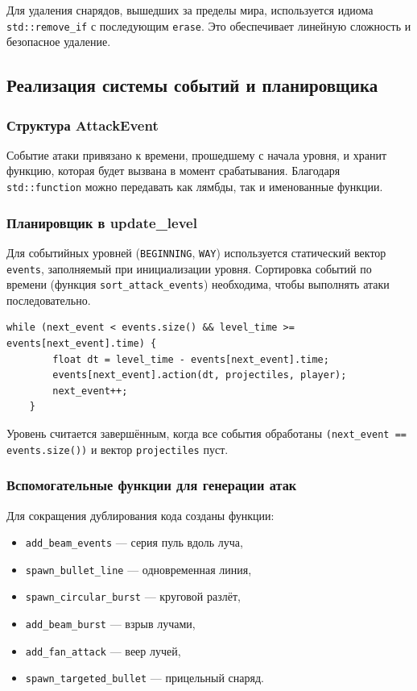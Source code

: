 \documentclass[../main.tex]{subfiles}
\begin{document}
Для удаления снарядов, вышедших за пределы мира, используется идиома \texttt{std::remove\_if} с последующим \texttt{erase}. Это обеспечивает линейную сложность и безопасное удаление.

\subsection{Реализация системы событий и планировщика}

\subsubsection{Структура AttackEvent}

Событие атаки привязано к времени, прошедшему с начала уровня, и хранит функцию, которая будет вызвана в момент срабатывания. Благодаря \texttt{std::function} можно передавать как лямбды, так и именованные функции.

\subsubsection{Планировщик в update\_level}

Для событийных уровней (\texttt{BEGINNING}, \texttt{WAY}) используется статический вектор \texttt{events}, заполняемый при инициализации уровня. Сортировка событий по времени (функция \texttt{sort\_attack\_events}) необходима, чтобы выполнять атаки последовательно.

\begin{lstlisting}[caption={Цикл обработки событий}]
	while (next_event < events.size() && level_time >= events[next_event].time) {
		float dt = level_time - events[next_event].time;
		events[next_event].action(dt, projectiles, player);
		next_event++;
	}
\end{lstlisting}

Уровень считается завершённым, когда все события обработаны \texttt{(next\_event == events.size())} и вектор \texttt{projectiles} пуст.

\subsubsection{Вспомогательные функции для генерации атак}

Для сокращения дублирования кода созданы функции:
\begin{itemize}
	\item \texttt{add\_beam\_events} — серия пуль вдоль луча,
	\item \texttt{spawn\_bullet\_line} — одновременная линия,
	\item \texttt{spawn\_circular\_burst} — круговой разлёт,
	\item \texttt{add\_beam\_burst} — взрыв лучами,
	\item \texttt{add\_fan\_attack} — веер лучей,
	\item \texttt{spawn\_targeted\_bullet} — прицельный снаряд.
\end{itemize}
\end{document}

